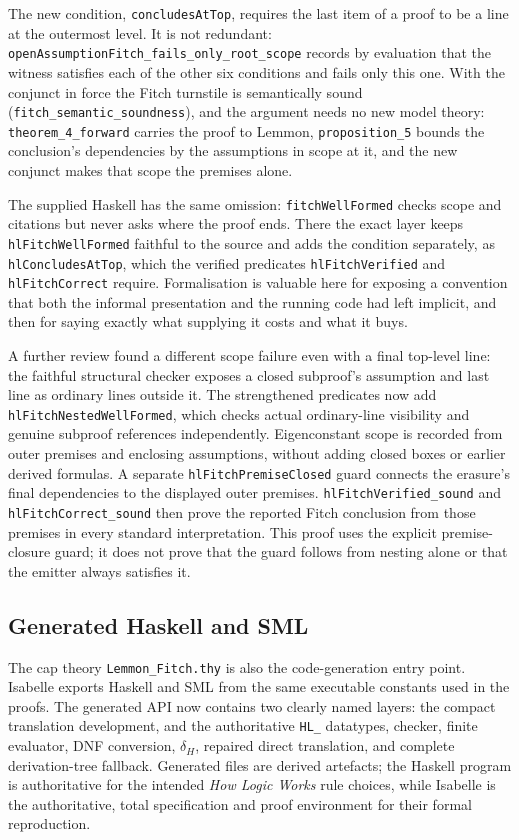 \documentclass[11pt]{article}
\theoremstyle{plain}
\theoremstyle{definition}
\theoremstyle{remark}
\begin{document}
The new condition, \verb|concludesAtTop|, requires the last item of a proof
to be a line at the
outermost level. It is not redundant:
\verb|openAssumptionFitch_fails_only_root_scope| records by evaluation that the
witness satisfies each of the other six conditions and fails only this one.
With the conjunct in force the Fitch turnstile is semantically sound
(\verb|fitch_semantic_soundness|), and the argument needs no new model theory:
\verb|theorem_4_forward| carries the proof to Lemmon, \verb|proposition_5|
bounds the conclusion's dependencies by the assumptions in scope at it, and the
new conjunct makes that scope the premises alone.

The supplied Haskell has the same omission: \verb|fitchWellFormed| checks scope
and citations but never asks where the proof ends. There the exact layer keeps
\verb|hlFitchWellFormed| faithful to the source and adds the condition
separately, as \verb|hlConcludesAtTop|, which the verified predicates
\verb|hlFitchVerified| and \verb|hlFitchCorrect| require. Formalisation is
valuable here for exposing a convention that both the informal presentation and
the running code had left implicit, and then for saying exactly what supplying
it costs and what it buys.

A further review found a different scope failure even with a final top-level
line: the faithful structural checker exposes a closed subproof's assumption
and last line as ordinary lines outside it. The strengthened predicates now
add \verb|hlFitchNestedWellFormed|, which checks actual ordinary-line visibility
and genuine subproof references independently. Eigenconstant scope is recorded
from outer premises and enclosing assumptions, without adding closed boxes or
earlier derived formulas. A separate \verb|hlFitchPremiseClosed| guard connects
the erasure's final dependencies to the displayed outer premises.
\verb|hlFitchVerified_sound| and \verb|hlFitchCorrect_sound| then prove the
reported Fitch conclusion from those premises in every standard interpretation.
This proof uses the explicit premise-closure guard; it does not prove that
the guard follows from nesting alone or that the emitter always satisfies it.

\subsection{Generated Haskell and SML}

The cap theory \verb|Lemmon_Fitch.thy| is also the code-generation entry point.
Isabelle exports Haskell and SML from the same executable constants used in
the proofs. The generated API now contains two clearly named layers: the
compact translation development, and the authoritative \verb|HL_| datatypes,
checker, finite evaluator, DNF conversion, $\delta_H$, repaired direct
translation, and complete derivation-tree fallback. Generated files
are derived artefacts; the Haskell program is authoritative for the intended
\emph{How Logic Works} rule choices, while Isabelle is the authoritative,
total specification and proof environment for their formal reproduction.
\end{document}
